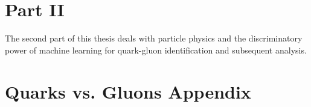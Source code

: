 \documentclass[a4paper, twoside, nobib]{tufte-book}
\begin{document}





\chapter*{Part II}
The second part of this thesis deals with particle physics and the discriminatory power of machine learning for quark-gluon identification and subsequent analysis. 














\appendix

% 


\chapter{Quarks vs. Gluons Appendix}



\backmatter

\listoffigures
{}

\listoftables
{}



% 


\printindex
\end{document}

